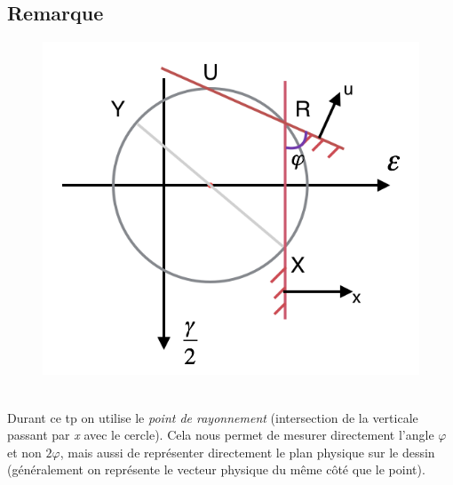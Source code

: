 \subsection*{Remarque}
\begin{figure}
\includegraphics[scale=0.5]{TP3-2}
\end{figure}
\ \\ Durant ce tp on utilise le \textit{point de rayonnement} (intersection de la verticale passant par \textit{x} avec le cercle). Cela nous permet de mesurer directement l'angle $\varphi$ et non $2 \varphi$, mais aussi de représenter directement le plan physique sur le dessin (généralement on représente le vecteur physique du même côté que le point).\\


